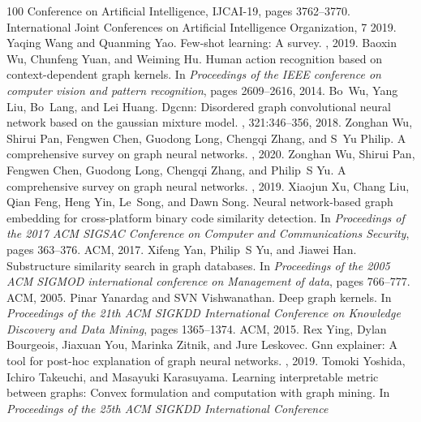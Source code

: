 \begin{thebibliography}{100}
{  Conference on Artificial Intelligence, {IJCAI-19}}, pages 3762--3770.
  International Joint Conferences on Artificial Intelligence Organization, 7
  2019.
Yaqing Wang and Quanming Yao.
\newblock Few-shot learning: A survey.
, 2019.
Baoxin Wu, Chunfeng Yuan, and Weiming Hu.
\newblock Human action recognition based on context-dependent graph kernels.
\newblock In {\em Proceedings of the IEEE conference on computer vision and
  pattern recognition}, pages 2609--2616, 2014.
Bo~Wu, Yang Liu, Bo~Lang, and Lei Huang.
\newblock Dgcnn: Disordered graph convolutional neural network based on the
  gaussian mixture model.
, 321:346--356, 2018.
Zonghan Wu, Shirui Pan, Fengwen Chen, Guodong Long, Chengqi Zhang, and S~Yu
  Philip.
\newblock A comprehensive survey on graph neural networks.
,
  2020.
Zonghan Wu, Shirui Pan, Fengwen Chen, Guodong Long, Chengqi Zhang, and Philip~S
  Yu.
\newblock A comprehensive survey on graph neural networks.
, 2019.
Xiaojun Xu, Chang Liu, Qian Feng, Heng Yin, Le~Song, and Dawn Song.
\newblock Neural network-based graph embedding for cross-platform binary code
  similarity detection.
\newblock In {\em Proceedings of the 2017 ACM SIGSAC Conference on Computer and
  Communications Security}, pages 363--376. ACM, 2017.
Xifeng Yan, Philip~S Yu, and Jiawei Han.
\newblock Substructure similarity search in graph databases.
\newblock In {\em Proceedings of the 2005 ACM SIGMOD international conference
  on Management of data}, pages 766--777. ACM, 2005.
Pinar Yanardag and SVN Vishwanathan.
\newblock Deep graph kernels.
\newblock In {\em Proceedings of the 21th ACM SIGKDD International Conference
  on Knowledge Discovery and Data Mining}, pages 1365--1374. ACM, 2015.
Rex Ying, Dylan Bourgeois, Jiaxuan You, Marinka Zitnik, and Jure Leskovec.
\newblock Gnn explainer: A tool for post-hoc explanation of graph neural
  networks.
, 2019.
Tomoki Yoshida, Ichiro Takeuchi, and Masayuki Karasuyama.
\newblock Learning interpretable metric between graphs: Convex formulation and
  computation with graph mining.
\newblock In {\em Proceedings of the 25th ACM SIGKDD International Conference
}
\end{thebibliography}

